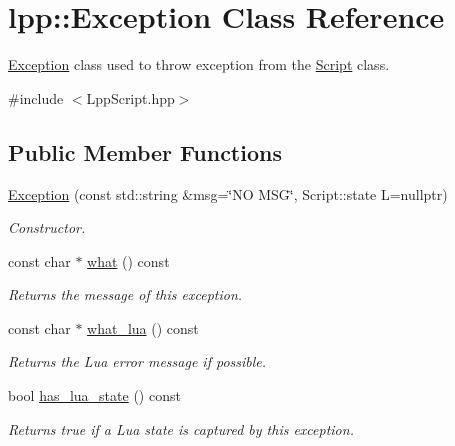 \hypertarget{classlpp_1_1_exception}{}\section{lpp\+:\+:Exception Class Reference}
\label{classlpp_1_1_exception}


\hyperlink{classlpp_1_1_exception}{Exception} class used to throw exception from the \hyperlink{classlpp_1_1_script}{Script} class.  




{\ttfamily \#include $<$Lpp\+Script.\+hpp$>$}

\subsection*{Public Member Functions}
\begin{DoxyCompactItemize}
\item 
\hyperlink{classlpp_1_1_exception_a1ff116cf88d7b05c3584877648ca82ab}{Exception} (const std\+::string \&msg=\char`\"{}NO M\+SG\char`\"{}, Script\+::state L=nullptr)
\begin{DoxyCompactList}\small\item\em Constructor. \end{DoxyCompactList}\item 
const char $\ast$ \hyperlink{classlpp_1_1_exception_ac20670138a33c7785532349e9bb6504b}{what} () const 
\begin{DoxyCompactList}\small\item\em Returns the message of this exception. \end{DoxyCompactList}\item 
const char $\ast$ \hyperlink{classlpp_1_1_exception_a3a02de1c4c93591ccfc6baeb71298d79}{what\+\_\+lua} () const 
\begin{DoxyCompactList}\small\item\em Returns the Lua error message if possible. \end{DoxyCompactList}\item 
bool \hyperlink{classlpp_1_1_exception_a0286545c71695a14ec1d30242e54afbd}{has\+\_\+lua\+\_\+state} () const 
\begin{DoxyCompactList}\small\item\em Returns true if a Lua state is captured by this exception. \end{DoxyCompactList}\end{DoxyCompactItemize}
